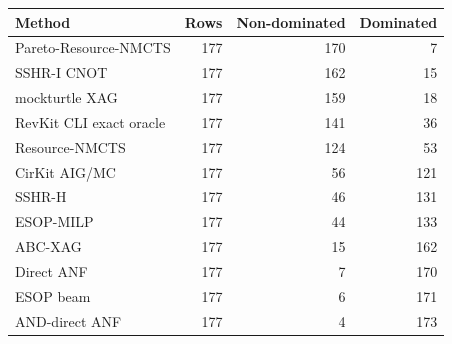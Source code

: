\begin{tabularx}{\linewidth}{>{\raggedright\arraybackslash}Xrrr}
\toprule
Method & Rows & Non-dominated & Dominated \\
\midrule
Pareto-Resource-NMCTS & 177 & 170 & 7 \\
SSHR-I CNOT & 177 & 162 & 15 \\
mockturtle XAG & 177 & 159 & 18 \\
RevKit CLI exact oracle & 177 & 141 & 36 \\
Resource-NMCTS & 177 & 124 & 53 \\
CirKit AIG/MC & 177 & 56 & 121 \\
SSHR-H & 177 & 46 & 131 \\
ESOP-MILP & 177 & 44 & 133 \\
ABC-XAG & 177 & 15 & 162 \\
Direct ANF & 177 & 7 & 170 \\
ESOP beam & 177 & 6 & 171 \\
AND-direct ANF & 177 & 4 & 173 \\
\bottomrule
\end{tabularx}
